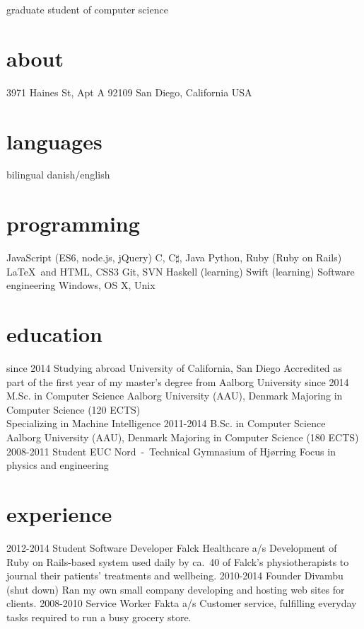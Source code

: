 \documentclass{afriggeri-cv/friggeri-cv}
\newcommand{\aau}{%
  Aalborg University (AAU), Denmark
}
\begin{document}
       {graduate student of computer science}

\begin{aside}
  \section{about}
    3971 Haines St, Apt A
    92109 San Diego, California
    USA
    ~
  \section{languages}
    bilingual danish/english
  \section{programming}
    JavaScript
    (ES6, node.js, jQuery)
    C, C$\sharp$, Java
    Python, Ruby
    (Ruby on Rails)
    \LaTeX\ and \XeTeX
    HTML, CSS3
    Git, SVN
    Haskell (learning)
    Swift (learning)
    Software engineering
    Windows, OS X, Unix
\end{aside}

\section{education}

\begin{entrylist}
  \entry
    {since 2014}
    {Studying abroad}
    {University of California, San Diego}
    {Accredited as part of the first year of my master's degree from Aalborg University}
  \entry
    {since 2014}
    {M.Sc. {\normalfont in Computer Science}}
    {\aau}
    {Majoring in Computer Science (120 ECTS)\\
    Specializing in Machine Intelligence}
  \entry
    {2011-2014}
    {B.Sc. {\normalfont in Computer Science}}
    {\aau}
    {Majoring in Computer Science (180 ECTS)}
  \entry
    {2008-2011}
    {Student}
    {EUC Nord~-~Technical Gymnasium of Hjørring}
    {Focus in physics and engineering}
\end{entrylist}

\section{experience}

\begin{entrylist}
  \entry
    {2012-2014}
    {Student Software Developer}
    {Falck Healthcare a/s}
    {Development of Ruby on Rails-based system used daily by ca.\ 40 of Falck's physiotherapists to journal their patients' treatments and wellbeing.}
  \entry
    {2010-2014}
    {Founder}
    {Divambu (shut down)}
    {Ran my own small company developing and hosting web sites for clients.}
  \entry
    {2008-2010}
    {Service Worker}
    {Fakta a/s}
    {Customer service, fulfilling everyday tasks required to run a busy grocery store.} 
\end{entrylist}
\end{document}
